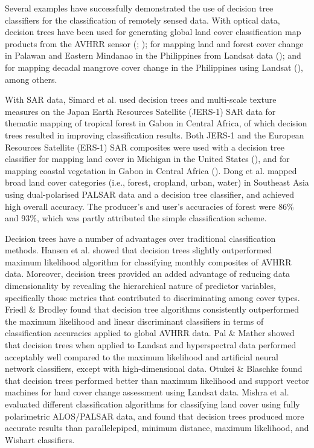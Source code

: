 Several examples have successfully demonstrated the use of decision tree classifiers for the classification of remotely sensed data. With optical data, decision trees have been used for generating global land cover classification map products from the AVHRR sensor (\cite{defries_global_1998}; \cite{hansen_global_2000}); for mapping land and forest cover change in Palawan and Eastern Mindanao in the Philippines from Landsat data (\cite{pereira_forest_2006}); and for mapping decadal mangrove cover change in the Philippines using Landsat (\cite{long_mapping_2013}), among others.

With SAR data, Simard et al. \citeyearpar{simard_use_2000} used decision trees and multi-scale texture measures on the Japan Earth Resources Satellite (JERS-1) SAR data for thematic mapping of tropical forest in Gabon in Central Africa, of which decision trees resulted in improving classification results. Both JERS-1 and the European Resources Satellite (ERS-1) SAR composites were used with a decision tree classifier for mapping land cover in Michigan in the United States (\cite{dobson_knowledge-based_1996}), and for mapping coastal vegetation in Gabon in Central Africa (\cite{simard_mapping_2002}). Dong et al. \citeyearpar{dong_50-m_2014} mapped broad land cover categories (i.e., forest, cropland, urban, water) in Southeast Asia using dual-polarised PALSAR data and a decision tree classifier, and achieved high overall accuracy. The producer's and user's accuracies of forest were 86\% and 93\%, which was partly attributed the simple classification scheme.

Decision trees have a number of advantages over traditional classification methods. Hansen et al. \citeyearpar{hansen_classification_1996} showed that decision trees slightly outperformed maximum likelihood algorithm for classifying monthly composites of AVHRR data. Moreover, decision trees provided an added advantage of reducing data dimensionality by revealing the hierarchical nature of predictor variables, specifically those metrics that contributed to discriminating among cover types. Friedl \& Brodley \citeyearpar{friedl_decision_1997} found that decision tree algorithms consistently outperformed the maximum likelihood and linear discriminant classifiers in terms of classification accuracies applied to global AVHRR data. Pal \& Mather \citeyearpar{pal_assessment_2003} showed that decision trees when applied to Landsat and hyperspectral data performed acceptably well compared to the maximum likelihood and artificial neural network classifiers, except with high-dimensional data. Otukei \& Blaschke \citeyearpar{otukei_land_2010} found that decision trees performed better than maximum likelihood and support vector machines for land cover change assessment using Landsat data. Mishra et al. \citeyearpar{mishra_land_2011} evaluated different classification algorithms for classifying land cover using fully polarimetric ALOS/PALSAR data, and found that decision trees produced more accurate results than parallelepiped, minimum distance, maximum likelihood, and Wishart classifiers.

